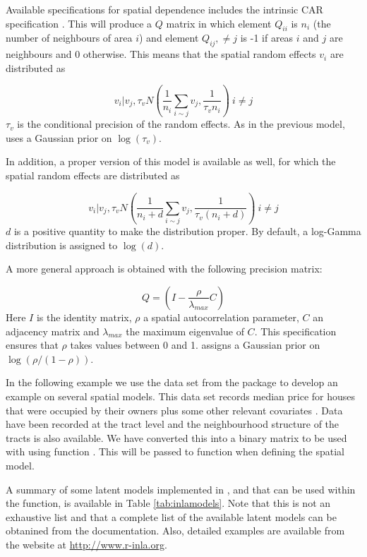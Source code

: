 \documentclass[article]{jss}
\begin{document}
Available specifications for spatial dependence includes the intrinsic CAR
specification \citep{besagetal:1991}. This will produce a $Q$ matrix in which
element $Q_{ii}$ is $n_i$ (the number of neighbours of area $i$) and element
$Q_{ij},\neq j$ is -1 if areas $i$ and $j$ are neighbours and 0 otherwise. This
means that the spatial random effects $v_i$ are distributed as

$$
v_i|v_j,\tau_v N( \frac{1}{n_i}\sum_{i\sim j} v_j, \frac{1}{\tau_vn_i})\ i\neq j
$$
\noindent
$\tau_v$ is the conditional precision of the random effects. As in the previous
model,  uses a Gaussian prior on $\log(\tau_v)$.

In addition, a proper version of this model is available as well,
for which the spatial random effects are distributed as

$$
v_i|v_j,\tau_v N( \frac{1}{n_i+d}\sum_{i\sim j} v_j, \frac{1}{\tau_v(n_i+d)})\ i\neq j
$$
\noindent
$d$ is a positive quantity to make the distribution proper. By default,
a log-Gamma distribution is assigned to $\log(d)$.

A more general approach is obtained  with the following precision
matrix:

$$
Q = (I - \frac{\rho}{\lambda_{max}}C)
$$
\noindent
Here $I$ is the identity matrix, $\rho$ a spatial autocorrelation parameter,
$C$ an adjacency matrix and $\lambda_{max}$ the maximum eigenvalue of $C$.
This specification ensures that $\rho$ takes values between 0 and 1.
 assigns a Gaussian prior on $\log(\rho/(1-\rho))$.

In the following example we use the  data set from the
 package  to develop an example on several spatial
models.  This data set  records median price for houses that were occupied by
their owners plus some other relevant covariates \citep[see,][for
details]{HarrisonRubinfeld:1978}. Data have been recorded at the tract level
and the neighbourhood structure of the tracts is also available.
We have converted this into a binary matrix to be used with 
using function . This will be passed to function  when
defining the spatial model.

A summary of some latent models implemented in , and that can be
used within the  function, is available in Table
\ref{tab:inlamodels}. Note that this is not an exhaustive list and that a
complete list of the available latent models can be obtanined from the
 documentation. Also, detailed examples are available from the
 website at \url{http://www.r-inla.org}.
\end{document}
